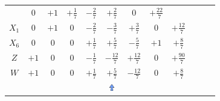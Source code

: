 \documentclass{beamer}
\begin{document}
\begin{frame}
{\begin{table}
\begin{tabular}{c c c c c c c c c c c c}
				& \cellcolor{yellow!50} $\scriptstyle 0$
				& \cellcolor{yellow!50} $\scriptstyle +1$
				& \cellcolor{yellow!50} $\scriptstyle +\frac{1}{7}$
				& \cellcolor{gray!50} $\scriptstyle -\frac{2}{7}$
				& \cellcolor{yellow!50} $\scriptstyle +\frac{2}{7}$
				& \cellcolor{yellow!50} $\scriptstyle 0$
				& \cellcolor{yellow!50} $\scriptstyle +\frac{22}{7}$ \\
			    \cellcolor{blue!100} \color{red} $\scriptstyle X_1$
				& \cellcolor{yellow!50} $\scriptstyle 0$
				& \cellcolor{yellow!50} $\scriptstyle +1$
				& \cellcolor{yellow!50} $\scriptstyle 0$
				& \cellcolor{yellow!50} $\scriptstyle -\frac{2}{7}$			
				& \cellcolor{gray!50} $\scriptstyle -\frac{3}{7}$
				& \cellcolor{yellow!50} $\scriptstyle +\frac{3}{7}$
				& \cellcolor{yellow!50} $\scriptstyle 0$ 
				& \cellcolor{yellow!50} $\scriptstyle +\frac{12}{7}$ \\
				\cellcolor{blue!100} \color{red} $\scriptstyle X_6$
				& \cellcolor{yellow!50} $\scriptstyle 0$
				& \cellcolor{yellow!50} $\scriptstyle 0$
				& \cellcolor{yellow!50} $\scriptstyle 0$
				& \cellcolor{yellow!50} $\scriptstyle +\frac{1}{7}$
				& \cellcolor{gray!50} $\scriptstyle +\frac{5}{7}$
				& \cellcolor{yellow!50} $\scriptstyle -\frac{5}{7}$
				& \cellcolor{yellow!50} $\scriptstyle +1$
				& \cellcolor{yellow!50} $\scriptstyle +\frac{8}{7}$ \\
				\cellcolor{blue!100} \color{white} $\scriptstyle Z$
				& \cellcolor{yellow!50} $\scriptstyle +1$
				& \cellcolor{yellow!50} $\scriptstyle 0$
				& \cellcolor{yellow!50} $\scriptstyle 0$
				& \cellcolor{yellow!50} $\scriptstyle -\frac{1}{7}$
				& \cellcolor{gray!50} $\scriptstyle -\frac{12}{7}$
				& \cellcolor{yellow!50} $\scriptstyle +\frac{12}{7}$
				& \cellcolor{yellow!50} $\scriptstyle 0$ 
				& \cellcolor{yellow!50} $\scriptstyle +\frac{90}{7}$  \\
				\cellcolor{blue!100} \color{white} $\scriptstyle W$
				& \cellcolor{yellow!90} $\scriptstyle +1$
				& \cellcolor{yellow!90} $\scriptstyle 0$
				& \cellcolor{yellow!90} $\scriptstyle 0$
				& \cellcolor{yellow!90} $\scriptstyle +\frac{1}{7}$
				& \cellcolor{gray!50} $\scriptstyle +\frac{5}{7}$
				& \cellcolor{yellow!90} $\scriptstyle -\frac{12}{7}$
				& \cellcolor{yellow!90} $\scriptstyle 0$ 
				& \cellcolor{yellow!90} $\scriptstyle +\frac{8}{7}$  \\
				& & & & & \includegraphics[width=0.3cm,height=0.3cm]{setacima.jpg} \\

\end{tabular}
\end{table}}
\end{frame}
\end{document}
